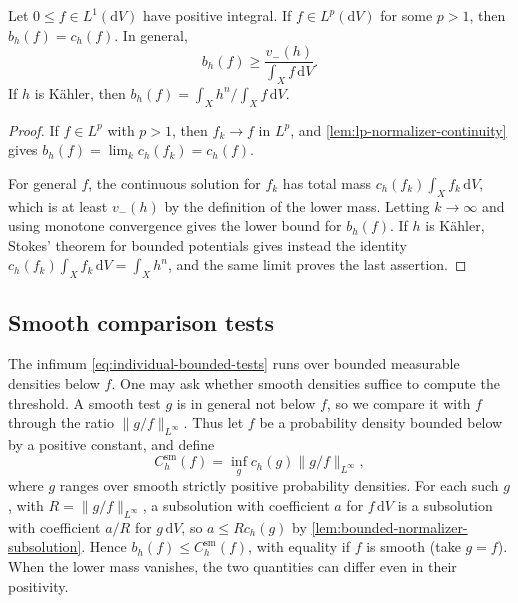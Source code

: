 

\begin{proposition}\label{prop:individual-normalizer-lp}
Let $0\leq f\in L^1(\mathrm{d}V)$ have positive integral. If $f\in L^p(\mathrm{d}V)$ for some $p>1$, then $b_h(f)=c_h(f)$. In general,
\[
 b_h(f)\geq\frac{v_-(h)}{\int_Xf\,\mathrm{d}V}.
\]
If $h$ is K\"ahler, then $b_h(f)=\int_Xh^n/\int_Xf\,\mathrm{d}V$.
\end{proposition}
\begin{proof}
If $f\in L^p$ with $p>1$, then $f_k\to f$ in $L^p$, and \cref{lem:lp-normalizer-continuity} gives $b_h(f)=\lim_kc_h(f_k)=c_h(f)$.

For general $f$, the continuous solution for $f_k$ has total mass $c_h(f_k)\int_Xf_k\,\mathrm{d}V$, which is at least $v_-(h)$ by the definition of the lower mass. Letting $k\to\infty$ and using monotone convergence gives the lower bound for $b_h(f)$. If $h$ is K\"ahler, Stokes' theorem for bounded potentials gives instead the identity $c_h(f_k)\int_Xf_k\,\mathrm{d}V=\int_Xh^n$, and the same limit proves the last assertion.
\end{proof}

\subsection{Smooth comparison tests}\label{subsec:individual-smooth-tests}

The infimum \eqref{eq:individual-bounded-tests} runs over bounded measurable densities below $f$. One may ask whether smooth densities suffice to compute the threshold. A smooth test $g$ is in general not below $f$, so we compare it with $f$ through the ratio $\|g/f\|_{L^\infty}$. Thus let $f$ be a probability density bounded below by a positive constant, and define
\[
 C_h^{\mathrm{sm}}(f)=\inf_g c_h(g)\|g/f\|_{L^\infty},
\]
where $g$ ranges over smooth strictly positive probability densities. For each such $g$, with $R=\|g/f\|_{L^\infty}$, a subsolution with coefficient $a$ for $f\,\mathrm{d}V$ is a subsolution with coefficient $a/R$ for $g\,\mathrm{d}V$, so $a\leq Rc_h(g)$ by \cref{lem:bounded-normalizer-subsolution}. Hence $b_h(f)\leq C_h^{\mathrm{sm}}(f)$, with equality if $f$ is smooth (take $g=f$). When the lower mass vanishes, the two quantities can differ even in their positivity.

